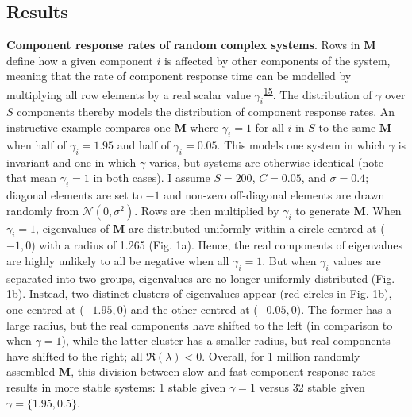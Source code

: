 \documentclass[]{article}
\begin{document}
\subsection{Results}\label{results}

\textbf{Component response rates of random complex systems}. Rows in
\(\mathbf{M}\) define how a given component \(i\) is affected by other
components of the system, meaning that the rate of component response
time can be modelled by multiplying all row elements by a real scalar
value
\(\gamma_{i}\)\textsuperscript{\protect\hyperlink{ref-Patel2018}{15}}.
The distribution of \(\gamma\) over \(S\) components thereby models the
distribution of component response rates. An instructive example
compares one \(\mathbf{M}\) where \(\gamma_{i} = 1\) for all \(i\) in
\(S\) to the same \(\mathbf{M}\) when half of \(\gamma_{i} = 1.95\) and
half of \(\gamma_{i} = 0.05\). This models one system in which
\(\gamma\) is invariant and one in which \(\gamma\) varies, but systems
are otherwise identical (note that mean \(\gamma_{i} = 1\) in both
cases). I assume \(S = 200\), \(C = 0.05\), and \(\sigma = 0.4\);
diagonal elements are set to \(-1\) and non-zero off-diagonal elements
are drawn randomly from \(\mathcal{N}(0, \sigma^{2})\). Rows are then
multiplied by \(\gamma_{i}\) to generate \(\mathbf{M}\). When
\(\gamma_{i} = 1\), eigenvalues of \(\mathbf{M}\) are distributed
uniformly within a circle centred at (\(-1, 0\)) with a radius of 1.265
(Fig. 1a). Hence, the real components of eigenvalues are highly unlikely
to all be negative when all \(\gamma_{i} = 1\). But when \(\gamma_{i}\)
values are separated into two groups, eigenvalues are no longer
uniformly distributed (Fig. 1b). Instead, two distinct clusters of
eigenvalues appear (red circles in Fig. 1b), one centred at
(\(-1.95, 0\)) and the other centred at (\(-0.05, 0\)). The former has a
large radius, but the real components have shifted to the left (in
comparison to when \(\gamma = 1\)), while the latter cluster has a
smaller radius, but real components have shifted to the right; all
\(\Re({\lambda}) < 0\). Overall, for 1 million randomly assembled
\(\mathbf{M}\), this division between slow and fast component response
rates results in more stable systems: 1 stable given \(\gamma = 1\)
versus 32 stable given \(\gamma = \{1.95, 0.5\}\).
\end{document}
